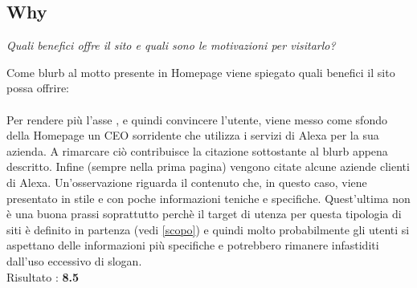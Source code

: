 \subsection{Why}
\begin{center}

\textit{Quali benefici offre il sito e quali sono le motivazioni per visitarlo?}

\end{center}
\begin{flushleft}
Come blurb al motto presente in Homepage viene spiegato quali benefici il sito 
possa offrire: \\
\\
Per rendere più  l'asse , e quindi convincere l'utente,
viene messo come sfondo della Homepage un CEO sorridente che utilizza i servizi di Alexa
per la sua azienda. A rimarcare ciò contribuisce la citazione sottostante al 
blurb appena descritto. Infine (sempre nella prima pagina)
vengono citate alcune aziende clienti di Alexa. Un'osservazione riguarda il contenuto
che, in questo caso, viene presentato in stile  e con poche informazioni
teniche e specifiche. Quest'ultima non è una buona prassi soprattutto perchè il target di utenza
per questa tipologia di siti è definito in partenza (vedi \ref{scopo}) e quindi
molto probabilmente gli utenti si aspettano delle informazioni più specifiche 
e potrebbero rimanere infastiditi dall'uso eccessivo di slogan. \\
Risultato : \textbf{8.5}

\end{flushleft}